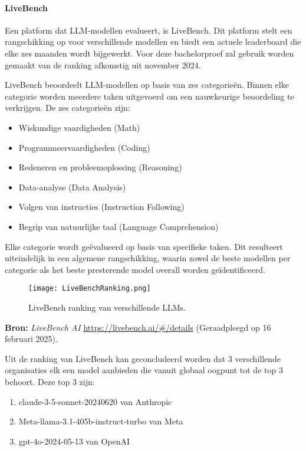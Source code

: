         
        \paragraph{LiveBench} 
        Een platform dat LLM-modellen evalueert, is LiveBench. Dit platform stelt een rangschikking op voor verschillende modellen en biedt een actuele leaderboard die elke zes maanden wordt bijgewerkt. Voor deze bachelorproef zal gebruik worden gemaakt van de ranking afkomstig uit november 2024.
        
        LiveBench beoordeelt LLM-modellen op basis van zes categorieën. Binnen elke categorie worden meerdere taken uitgevoerd om een nauwkeurige beoordeling te verkrijgen. De zes categorieën zijn:
        \begin{itemize}
            \item Wiskundige vaardigheden (Math)
            \item Programmeervaardigheden (Coding)
            \item Redeneren en probleemoplossing (Reasoning)
            \item Data-analyse (Data Analysis)
            \item Volgen van instructies (Instruction Following)
            \item Begrip van natuurlijke taal (Language Comprehension)
        \end{itemize}
        
        Elke categorie wordt geëvalueerd op basis van specifieke taken. Dit resulteert uiteindelijk in een algemene rangschikking, waarin zowel de beste modellen per categorie als het beste presterende model overall worden geïdentificeerd.
        
        \begin{figure}[H]
            \centering
            \texttt{[image: LiveBenchRanking.png]}
            \caption{LiveBench ranking van verschillende LLMs.}
            \label{fig:livebench}
        \end{figure}
        
        \noindent\textbf{Bron:} \textit{LiveBench AI} \url{https://livebench.ai/#/details} (Geraadpleegd op 16 februari 2025).
        
        Uit de ranking van LiveBench kan geconcludeerd worden dat 3 verschillende organisaties elk een model aanbieden die vanuit globaal oogpunt tot de top 3 behoort. Deze top 3 zijn: 
        \begin{enumerate}
            \item claude-3-5-sonnet-20240620 van Anthropic
            \item Meta-llama-3.1-405b-instruct-turbo van Meta
            \item gpt-4o-2024-05-13 van OpenAI
        \end{enumerate}
        
